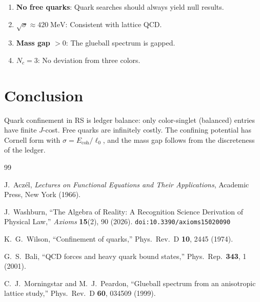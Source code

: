 \documentclass[12pt,a4paper]{article}
\theoremstyle{definition}
\theoremstyle{remark}
\begin{document}
\begin{enumerate}
  \item \textbf{No free quarks}: Quark searches should always
  yield null results.

  \item \textbf{$\sqrt{\sigma} \approx 420\;\mathrm{MeV}$}:
  Consistent with lattice QCD.

  \item \textbf{Mass gap $> 0$}: The glueball spectrum is gapped.

  \item \textbf{$N_c = 3$}: No deviation from three colors.
\end{enumerate}

\section{Conclusion}
\label{sec:conclusion}

Quark confinement in RS is ledger balance: only color-singlet
(balanced) entries have finite $J$-cost.  Free quarks are
infinitely costly.  The confining potential has Cornell form with
$\sigma = E_{\mathrm{coh}}/\ell_0$, and the mass gap follows from the
discreteness of the ledger.

\begin{thebibliography}{99}

J.~Acz\'el, \emph{Lectures on Functional Equations and Their Applications},
Academic Press, New York (1966).

J.~Washburn, ``The Algebra of Reality: A Recognition Science Derivation
of Physical Law,'' \emph{Axioms} \textbf{15}(2), 90 (2026).
\texttt{doi:10.3390/axioms15020090}

K.~G.~Wilson, ``Confinement of quarks,'' Phys.\ Rev.\ D
\textbf{10}, 2445 (1974).

G.~S.~Bali, ``QCD forces and heavy quark bound states,''
Phys.\ Rep.\ \textbf{343}, 1 (2001).

C.~J.~Morningstar and M.~J.~Peardon, ``Glueball spectrum from
an anisotropic lattice study,'' Phys.\ Rev.\ D \textbf{60},
034509 (1999).

\end{thebibliography}
\end{document}
